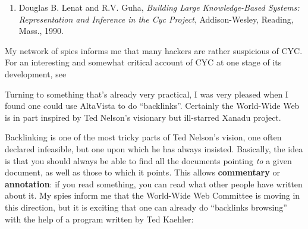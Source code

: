 \documentclass{article}
\def\tightlist{}
\renewcommand{\texttt}[1]{%
  \begingroup
  \ttfamily
  \begingroup\lccode`~=`/\lowercase{\endgroup\def~}{/\discretionary{}{}{}}%
  \begingroup\lccode`~=`[\lowercase{\endgroup\def~}{[\discretionary{}{}{}}%
  \begingroup\lccode`~=`.\lowercase{\endgroup\def~}{.\discretionary{}{}{}}%
  \catcode`/=\active\catcode`[=\active\catcode`.=\active
  \scantokens{#1\noexpand}%
  \endgroup
}
\begin{document}
\begin{enumerate}
\def\labelenumi{\arabic{enumi})}
\setcounter{enumi}{2}
\tightlist
\item
  Douglas B. Lenat and R.V. Guha, \emph{Building Large Knowledge-Based
  Systems: Representation and Inference in the Cyc Project},
  Addison-Wesley, Reading, Mass., 1990.
\end{enumerate}

My network of spies informs me that many hackers are rather suspicious
of CYC. For an interesting and somewhat critical account of CYC at one
stage of its development, see


Turning to something that's already very practical, I was very pleased
when I found one could use AltaVista to do ``backlinks''. Certainly the
World-Wide Web is in part inspired by Ted Nelson's visionary but
ill-starred Xanadu project.


Backlinking is one of the most tricky parts of Ted Nelson's vision, one
often declared infeasible, but one upon which he has always insisted.
Basically, the idea is that you should always be able to find all the
documents pointing \emph{to} a given document, as well as those to which
it points. This allows \textbf{commentary} or \textbf{annotation}: if
you read something, you can read what other people have written about
it. My spies inform me that the World-Wide Web Committee is moving in
this direction, but it is exciting that one can already do ``backlinks
browsing'' with the help of a program written by Ted Kaehler:

\end{document}
